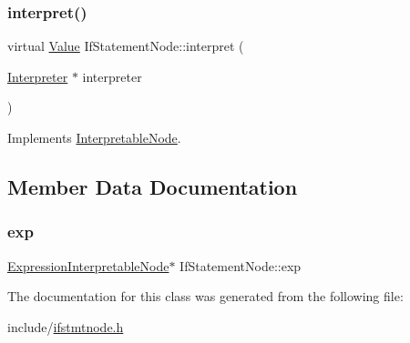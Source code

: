 \subsubsection{\texorpdfstring{interpret()}{interpret()}}
{\footnotesize\ttfamily virtual \hyperlink{classValue}{Value} If\+Statement\+Node\+::interpret (\begin{DoxyParamCaption}\item[{\hyperlink{classInterpreter}{Interpreter} $\ast$}]{interpreter }\end{DoxyParamCaption})\hspace{0.3cm}{\ttfamily [virtual]}}



Implements \hyperlink{classInterpretableNode_a9a466e7d65c4b323d2b96b4ac8396cd7}{Interpretable\+Node}.



\subsection{Member Data Documentation}
\mbox{\label{classIfStatementNode_a021cd8dd0edd333f98d74cfd1c38acd0}} 
\subsubsection{\texorpdfstring{exp}{exp}}
{\footnotesize\ttfamily \hyperlink{classExpressionInterpretableNode}{Expression\+Interpretable\+Node}$\ast$ If\+Statement\+Node\+::exp}



The documentation for this class was generated from the following file\+:\begin{DoxyCompactItemize}
\item 
include/\hyperlink{ifstmtnode_8h}{ifstmtnode.\+h}\end{DoxyCompactItemize}
